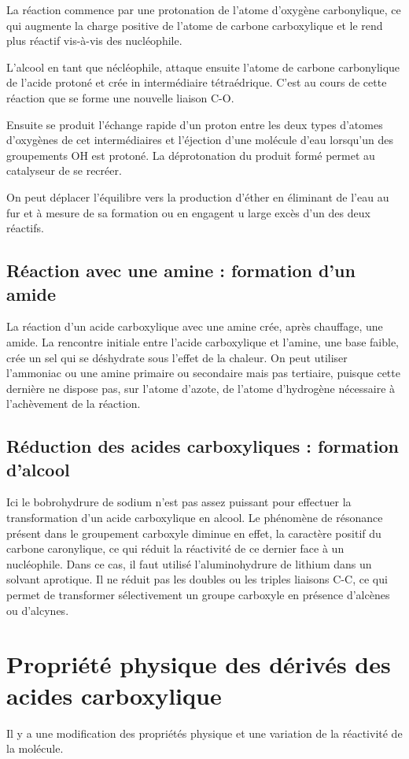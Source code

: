 La réaction commence par une protonation de l'atome d'oxygène carbonylique, ce qui augmente la charge positive de l'atome de carbone carboxylique et le rend plus réactif vis-à-vis des nucléophile.

L'alcool en tant que nécléophile, attaque ensuite l'atome de carbone carbonylique de l'acide protoné et crée in intermédiaire tétraédrique.
C'est au cours de cette réaction que se forme une nouvelle liaison C-O.

Ensuite se produit l'échange rapide d'un proton entre les deux types d'atomes d'oxygènes de cet intermédiaires et l'éjection d'une molécule d'eau lorsqu'un des groupements OH est protoné.
La déprotonation du produit formé  permet au catalyseur de se recréer.

On peut déplacer l'équilibre vers la production d'éther en éliminant de l'eau au fur et à mesure de sa formation ou en engagent u large excès d'un des deux réactifs.

\subsection{Réaction avec une amine : formation d'un amide}
La réaction d'un acide carboxylique avec une amine crée, après chauffage, une amide.
La rencontre initiale entre l'acide carboxylique et l'amine, une base faible, crée un sel qui se déshydrate sous l'effet de la chaleur.
On peut utiliser l'ammoniac ou une amine primaire ou secondaire mais pas tertiaire, puisque cette dernière ne dispose pas, sur l'atome d'azote, de l'atome d'hydrogène nécessaire à l'achèvement de la réaction.

\subsection{Réduction des acides carboxyliques : formation d'alcool}

Ici le bobrohydrure de sodium n'est pas assez puissant pour effectuer la transformation d'un acide carboxylique en alcool.
Le phénomène de résonance présent dans le groupement carboxyle diminue en effet, la caractère positif du carbone caronylique, ce qui réduit la réactivité de ce dernier face à un nucléophile.
Dans ce cas, il faut utilisé l'aluminohydrure de lithium dans un solvant aprotique.
Il ne réduit pas les doubles ou les triples liaisons C-C, ce qui permet de transformer sélectivement un groupe carboxyle en présence d'alcènes ou d'alcynes.


\section{Propriété physique des  dérivés des acides carboxylique}
Il y a une modification des propriétés physique et une variation de la réactivité de la molécule.

